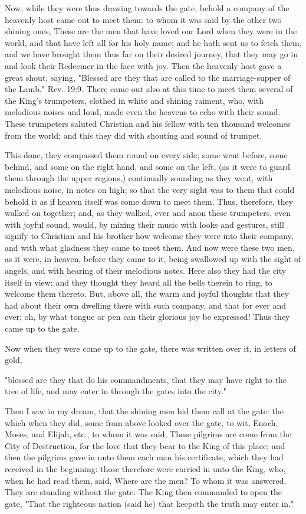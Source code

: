 Now, while they were thus drawing towards the gate, behold a company of
the heavenly host came out to meet them: to whom it was said by the
other two shining ones, These are the men that have loved our Lord when
they were in the world, and that have left all for his holy name; and
he hath sent us to fetch them, and we have brought them thus far on
their desired journey, that they may go in and look their Redeemer in
the face with joy. Then the heavenly host gave a great shout, saying,
"Blessed are they that are called to the marriage-supper of the Lamb."
Rev. 19:9. There came out also at this time to meet them several of the
King's trumpeters, clothed in white and shining raiment, who, with
melodious noises and loud, made even the heavens to echo with their
sound. These trumpeters saluted Christian and his fellow with ten
thousand welcomes from the world; and this they did with shouting and
sound of trumpet.

This done, they compassed them round on every side; some went before,
some behind, and some on the right hand, and some on the left, (as it
were to guard them through the upper regions,) continually sounding as
they went, with melodious noise, in notes on high; so that the very
sight was to them that could behold it as if heaven itself was come
down to meet them. Thus, therefore, they walked on together; and, as
they walked, ever and anon these trumpeters, even with joyful sound,
would, by mixing their music with looks and gestures, still signify to
Christian and his brother how welcome they were into their company, and
with what gladness they came to meet them. And now were these two men,
as it were, in heaven, before they came to it, being swallowed up with
the sight of angels, and with hearing of their melodious notes. Here
also they had the city itself in view; and they thought they heard all
the bells therein to ring, to welcome them thereto. But, above all, the
warm and joyful thoughts that they had about their own dwelling there
with such company, and that for ever and ever; oh, by what tongue or
pen can their glorious joy be expressed! Thus they came up to the gate.

Now when they were come up to the gate, there was written over it, in
letters of gold,

"blessed are they that do his commandments, that they may have right to
the tree of life, and may enter in through the gates into the city."

Then I saw in my dream, that the shining men bid them call at the gate:
the which when they did, some from above looked over the gate, to wit,
Enoch, Moses, and Elijah, etc., to whom it was said, These pilgrims are
come from the City of Destruction, for the love that they bear to the
King of this place; and then the pilgrims gave in unto them each man
his certificate, which they had received in the beginning: those
therefore were carried in unto the King, who, when he had read them,
said, Where are the men? To whom it was answered, They are standing
without the gate. The King then commanded to open the gate, "That the
righteous nation (said he) that keepeth the truth may enter in."

